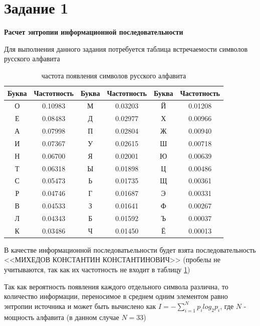 \documentclass[a4paper,12pt]{article}
\begin{document}
  \setcounter{page}{2}
  \section*{Задание 1}

  \textbf{Расчет энтропии информационной последовательности}

  Для выполнения данного задания потребуется таблица встречаемости символов русского алфавита

  \begin{table}[H]
    \centering
    \begin{tabular}{| c | c | c | c | c | c |}
        \hline
        Буква & Частотность & Буква & Частотность & Буква & Частотность \\
        \hline
        О & 0.10983 & М & 0.03203 & Й & 0.01208 \\
        Е & 0.08483 & Д & 0.02977 & Х & 0.00966 \\
        А & 0.07998 & П & 0.02804 & Ж & 0.00940 \\
        И & 0.07367 & У & 0.02615 & Ш & 0.00718 \\
        Н & 0.06700 & Я & 0.02001 & Ю & 0.00639 \\
        Т & 0.06318 & Ы & 0.01898 & Ц & 0.00486 \\
        С & 0.05473 & Ь & 0.01735 & Щ & 0.00361 \\
        Р & 0.04746 & Г & 0.01687 & Э & 0.00331 \\
        В & 0.04533 & З & 0.01641 & Ф & 0.00267 \\
        Л & 0.04343 & Б & 0.01592 & Ъ & 0.00037 \\
        К & 0.03486 & Ч & 0.01450 & Ё & 0.00013 \\
        \hline
    \end{tabular}
    \caption{частота появления символов русского алфавита}
    \label{table:1}
  \end{table}

  В качестве информационной последоватьельности будет взята последовательность <<МИХЕДОВ КОНСТАНТИН КОНСТАНТИНОВИЧ>> (пробелы не
  учитываются, так как их частотность не входит в таблицу \ref{table:1})

  Так как вероятность появления каждого отдельного символа различна, то количество
  информации, переносимое в среднем одним элементом равно энтропии источника и может быть
  вычислено как $I = -\sum\limits_{i = 1}^Np_ilog_2p_i$, где $N$ - мощность алфавита
  (в данном случае $N = 33$)
\end{document}
